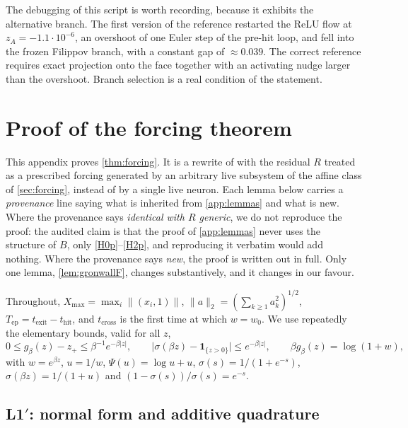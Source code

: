 \documentclass[11pt]{article}
\theoremstyle{definition}
\theoremstyle{remark}
\newcommand{\thit}{t_{\mathrm{hit}}}
\newcommand{\texit}{t_{\mathrm{exit}}}
\newcommand{\Tep}{T_{\mathrm{ep}}}   %
\newcommand{\tcross}{t_{\mathrm{cross}}}
\begin{document}
The debugging of this script is worth recording, because it exhibits the
alternative branch. The first version of the reference restarted the ReLU flow at
$z_A=-1.1\cdot10^{-6}$, an overshoot of one Euler step of the pre-hit loop, and
fell into the frozen Filippov branch, with a constant gap of $\approx0.039$. The
correct reference requires exact projection onto the face together with an
activating nudge larger than the overshoot. Branch selection is a real condition
of the statement.

\section{Proof of the forcing theorem}\label{app:forcing}

This appendix proves \cref{thm:forcing}. It is a rewrite of
 with the residual $R$ treated as a
prescribed forcing generated by an arbitrary live subsystem of the affine class
of \cref{sec:forcing}, instead of by a single live neuron. Each lemma below
carries a \emph{provenance} line saying what is inherited from
\cref{app:lemmas} and what is new. Where the provenance says \emph{identical
with $R$ generic}, we do not reproduce the proof: the audited claim is that the
proof of \cref{app:lemmas} never uses the structure of $B$, only
\eqref{H0p}--\eqref{H2p}, and reproducing it verbatim would add nothing. Where the
provenance says \emph{new}, the proof is written out in full. Only one lemma,
\cref{lem:gronwallF}, changes substantively, and it changes in our favour.

Throughout, $X_{\max}=\max_i\|(x_i,1)\|$, $\|a\|_2=(\sum_{k\ge1}a_k^2)^{1/2}$,
$\Tep=\texit-\thit$, and $\tcross$ is the first time at which $w=w_0$. We use
repeatedly the elementary bounds, valid for all $z$,
\begin{equation}\label{eq:softdefectF}
0\le g_\beta(z)-z_+\le\beta^{-1}e^{-\beta|z|},
\qquad
\bigl|\sigma(\beta z)-\mathbf 1_{\{z>0\}}\bigr|\le e^{-\beta|z|},
\qquad
\beta g_\beta(z)=\log(1+w),
\end{equation}
with $w=e^{\beta z}$, $u=1/w$, $\Psi(u)=\log u+u$, $\sigma(s)=1/(1+e^{-s})$,
$\sigma(\beta z)=1/(1+u)$ and $(1-\sigma(s))/\sigma(s)=e^{-s}$.

\subsection{L1$'$: normal form and additive quadrature}\label{app:F1}
\end{document}

